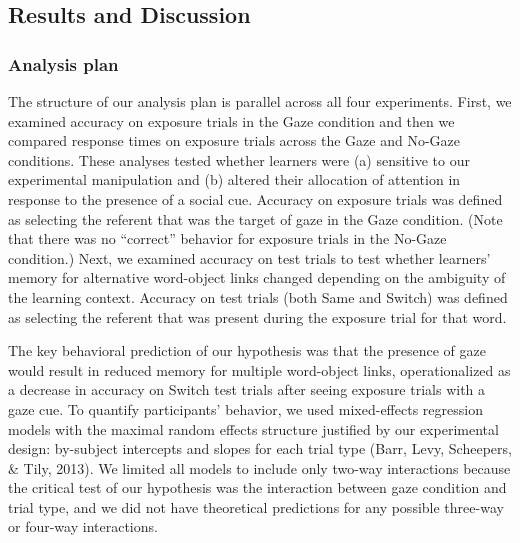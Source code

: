 \documentclass[oneside]{report}
\begin{document}
\subsection{Results and Discussion}\label{results-and-discussion}

\subsubsection{Analysis plan}\label{analysis-plan-1}

The structure of our analysis plan is parallel across all four
experiments. First, we examined accuracy on exposure trials in the Gaze
condition and then we compared response times on exposure trials across
the Gaze and No-Gaze conditions. These analyses tested whether learners
were (a) sensitive to our experimental manipulation and (b) altered
their allocation of attention in response to the presence of a social
cue. Accuracy on exposure trials was defined as selecting the referent
that was the target of gaze in the Gaze condition. (Note that there was
no ``correct'' behavior for exposure trials in the No-Gaze condition.)
Next, we examined accuracy on test trials to test whether learners'
memory for alternative word-object links changed depending on the
ambiguity of the learning context. Accuracy on test trials (both Same
and Switch) was defined as selecting the referent that was present
during the exposure trial for that word.

The key behavioral prediction of our hypothesis was that the presence of
gaze would result in reduced memory for multiple word-object links,
operationalized as a decrease in accuracy on Switch test trials after
seeing exposure trials with a gaze cue. To quantify participants'
behavior, we used mixed-effects regression models with the maximal
random effects structure justified by our experimental design:
by-subject intercepts and slopes for each trial type (Barr, Levy,
Scheepers, \& Tily, 2013). We limited all models to include only two-way
interactions because the critical test of our hypothesis was the
interaction between gaze condition and trial type, and we did not have
theoretical predictions for any possible three-way or four-way
interactions.
\end{document}
